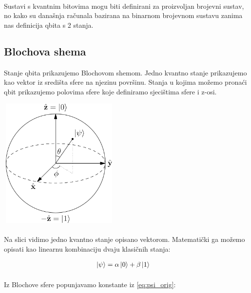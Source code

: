 \documentclass[times, utf8, zavrsni]{fer}
\begin{document}
\paragraph{}
Sustavi s kvantnim bitovima mogu biti definirani za proizvoljan brojevni sustav, no kako su današnja računala bazirana na binarnom brojevnom sustavu zanima nas definicija qbita s 2 stanja.

\subsection{Blochova shema}
\paragraph{}
Stanje qbita prikazujemo Blochovom shemom. Jedno kvantno stanje prikazujemo kao vektor iz središta sfere na njezinu površinu. Stanja u kojima možemo pronaći qbit prikazujemo polovima sfere koje definiramo sjecištima sfere i z-osi.

\begin{center}
\includegraphics[width=60mm, height=65mm]{bloch}
\end{center}

\paragraph{}
Na slici vidimo jedno kvantno stanje opisano vektorom. Matematički ga možemo opisati kao linearnu kombinaciju dvaju klasičnih stanja:

\begin{align}
\ket{\psi} &= \alpha\ket{0} + \beta\ket{1} \label{eq:psi_orig}
\end{align}

\paragraph{}
Iz Blochove sfere popunjavamo konstante iz \eqref{eq:psi_orig}:
\end{document}
